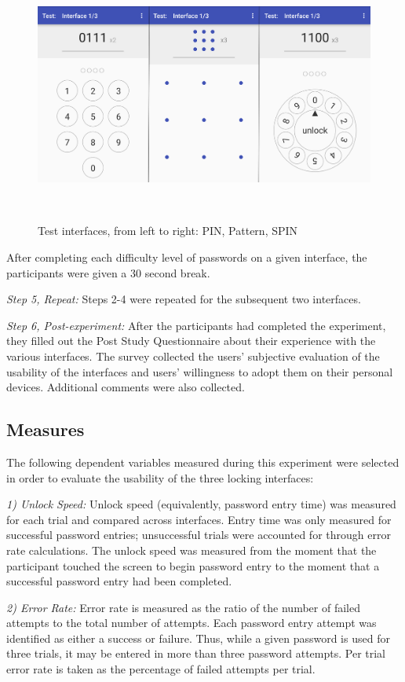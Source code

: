 \documentclass{sigchi}
\begin{document}
\begin{figure}[h]
  \centering
  \includegraphics[width=1\columnwidth]{figures/screenshot_test_all.png}
  \caption{Test interfaces, from left to right: PIN, Pattern, SPIN}~\label{fig:test_interfaces}
\end{figure}

After completing each difficulty level of passwords on a given interface, the participants were given a 30 second break. 

\textit{Step 5, Repeat: }
Steps 2-4 were repeated for the subsequent two interfaces.

\textit{Step 6, Post-experiment: }
After the participants had completed the experiment, they filled out the Post Study Questionnaire about their experience with the various interfaces. The survey collected the users' subjective evaluation of the usability of the interfaces and users' willingness to adopt them on their personal devices. Additional comments were also collected.

\subsection{Measures}
The following dependent variables measured during this experiment were selected in order to evaluate the usability of the three locking interfaces:

\textit{1) Unlock Speed: }
Unlock speed (equivalently, password entry time) was measured for each trial and compared across interfaces. Entry time was only measured for successful password entries; unsuccessful trials were accounted for through error rate calculations. The unlock speed was measured from the moment that the participant touched the screen to begin password entry to the moment that a successful password entry had been completed. 

\textit{2) Error Rate: }
Error rate is measured as the ratio of the number of failed attempts to the total number of attempts. Each password entry attempt was identified as either a success or failure. Thus, while a given password is used for three trials, it may be entered in more than three password attempts. Per trial error rate is taken as the percentage of failed attempts per trial. 
\end{document}
